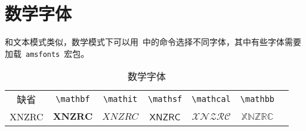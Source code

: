 \section{数学字体}
和文本模式类似，数学模式下可以用~中的命令选择不同字体，其中有些字体需要加载~\verb|amsfonts|~宏包。

\begin{table}[htbp]
\caption{数学字体}
\label{tab:math_font}
\centering
\begin{tabular}{ccccccc}
    \toprule
    缺省 & \verb|\mathbf| & \verb|\mathit| & \verb|\mathsf| & 
        \verb|\mathcal| & \verb|\mathbb| \\
    XNZRC & $\mathbf{XNZRC}$ & $\mathit{XNZRC}$ & $\mathsf{XNZRC}$ & 
        $\mathcal{XNZRC}$ & $\mathbb{XNZRC}$ \\
    \bottomrule
\end{tabular}
\end{table}



\newpage

